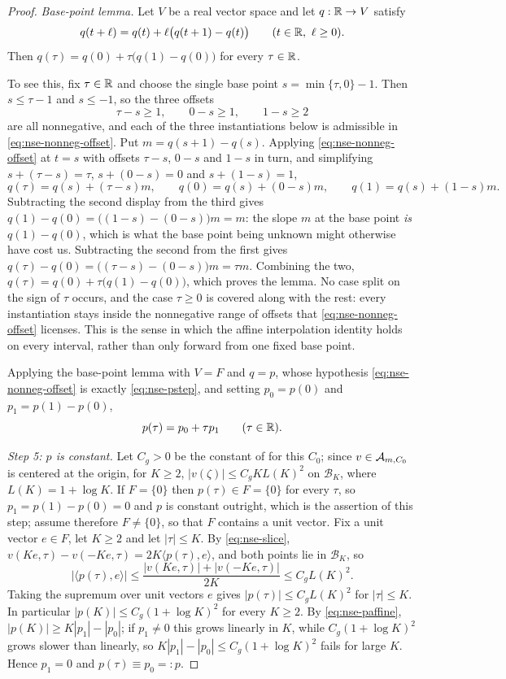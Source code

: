 \begin{proof}
\emph{Base-point lemma.} Let $V$ be a real vector space and let $q:\mathbb{R}\to V$
satisfy
\begin{equation}\label{eq:nse-nonneg-offset}
  q(t+\ell)=q(t)+\ell\bigl(q(t+1)-q(t)\bigr)\qquad(t\in\R,\ \ell\ge0).
\end{equation}
Then $q(\tau)=q(0)+\tau\bigl(q(1)-q(0)\bigr)$ for every $\tau\in\mathbb{R}$.

To see this, fix $\tau\in\mathbb{R}$ and choose the single base point
$s=\min\{\tau,0\}-1$. Then $s\le\tau-1$ and $s\le-1$, so the three offsets
\[
  \tau-s\ge1,\qquad 0-s\ge1,\qquad 1-s\ge2
\]
are all nonnegative, and each of the three instantiations below is admissible in
\eqref{eq:nse-nonneg-offset}. Put $m=q(s+1)-q(s)$. Applying
\eqref{eq:nse-nonneg-offset} at $t=s$ with offsets $\tau-s$, $0-s$ and $1-s$ in
turn, and simplifying $s+(\tau-s)=\tau$, $s+(0-s)=0$ and $s+(1-s)=1$,
\[
  q(\tau)=q(s)+(\tau-s)m,\qquad
  q(0)=q(s)+(0-s)m,\qquad
  q(1)=q(s)+(1-s)m .
\]
Subtracting the second display from the third gives
$q(1)-q(0)=\bigl((1-s)-(0-s)\bigr)m=m$: the slope $m$ at the base point
\emph{is} $q(1)-q(0)$, which is what the base point being unknown might
otherwise have cost us. Subtracting the second from the first gives
$q(\tau)-q(0)=\bigl((\tau-s)-(0-s)\bigr)m=\tau m$. Combining the two,
$q(\tau)=q(0)+\tau\bigl(q(1)-q(0)\bigr)$, which proves the lemma. No case split
on the sign of $\tau$ occurs, and the case $\tau\ge0$ is covered along with the
rest: every instantiation stays inside the nonnegative range of offsets that
\eqref{eq:nse-nonneg-offset} licenses. This is the sense in which the affine
interpolation identity holds on every interval, rather than only forward from one
fixed base point.

Applying the base-point lemma with $V=F$ and $q=p$, whose hypothesis
\eqref{eq:nse-nonneg-offset} is exactly \eqref{eq:nse-pstep}, and setting
$p_0=p(0)$ and $p_1=p(1)-p(0)$,
\begin{equation}\label{eq:nse-paffine}
  p(\tau)=p_0+\tau p_1\qquad(\tau\in\mathbb{R}).
\end{equation}

\emph{Step 5: $p$ is constant.}
Let $C_g>0$ be the constant of  for this $C_0$; since
$v\in\mathcal{A}_{m,C_0}$ is centered at the origin, for $K\ge2$,
$|v(\zeta)|\le C_gKL(K)^2$ on $\mathcal B_K$, where $L(K)=1+\log K$. If
$F=\{0\}$ then $p(\tau)\in F=\{0\}$ for every $\tau$, so $p_1=p(1)-p(0)=0$ and
$p$ is constant outright, which is the assertion of this step; assume therefore
$F\ne\{0\}$, so that $F$ contains a unit vector. Fix a unit vector $e\in F$, let
$K\ge2$ and let $|\tau|\le K$. By \eqref{eq:nse-slice},
$v(Ke,\tau)-v(-Ke,\tau)=2K\langle p(\tau),e\rangle$, and both points lie in
$\mathcal B_K$, so
\[
  \bigl|\langle p(\tau),e\rangle\bigr|
   \le\frac{|v(Ke,\tau)|+|v(-Ke,\tau)|}{2K}\le C_gL(K)^2 .
\]
Taking the supremum over unit vectors $e$ gives $|p(\tau)|\le C_gL(K)^2$ for
$|\tau|\le K$. In particular $|p(K)|\le C_g(1+\log K)^2$ for every $K\ge2$. By
\eqref{eq:nse-paffine}, $|p(K)|\ge K|p_1|-|p_0|$; if $p_1\ne0$ this grows
linearly in $K$, while $C_g(1+\log K)^2$ grows slower than linearly, so
$K|p_1|-|p_0|\le C_g(1+\log K)^2$ fails for large $K$. Hence $p_1=0$ and
$p(\tau)\equiv p_0=:p$.


\end{proof}
